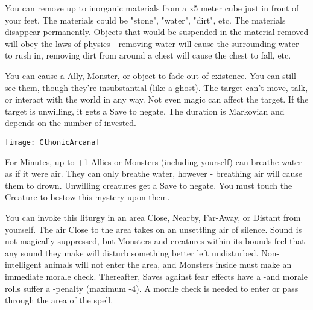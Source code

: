 {\MYSTERY [
  Name = Excavate,
  Link = arcana-mystery-excavate,
  Paradigm = Elements,
  Save = N,
  Duration = Instant,
  Target = Close
]

You can remove up to \DICE inorganic materials from a \DICE x5 meter cube just in front of your feet.  The materials could be "stone", "water", "dirt", etc. The materials disappear permanently. Objects that would be suspended in the material removed will obey the laws of physics - removing water will cause the surrounding water to rush in, removing dirt from around a chest will cause the chest to fall, etc.

\MYSTERY [
  Name = Fade,
  Link = arcana-mystery-fade,
  Paradigm = Mind,
  Save = Y (neg.),
  Duration = Markovian,
  Target = Nearby Target(s)
]

You can cause a Ally, Monster, or object to fade out of existence.  You can still see them, though they're insubstantial (like a ghost).  The target can't move, talk, or interact with the world in any way.  Not even magic can affect the target.  If the target is unwilling, it gets a Save to negate.  The duration is Markovian and depends on the number of \DICE invested.

  \begin{center}
  \texttt{[image: CthonicArcana]}
  \end{center}


\MYSTERY [
  Name = Mermaid's Breath,
  Link = arcana-mystery-mermaids-breath,
  Paradigm = Biomancy,
  Save = Y (neg.),
  Duration = \SUM Minutes,
  Target = Self or Close Target(s)
]

For \SUMDICE Minutes, up to \DICE+1 Allies or Monsters (including yourself) can breathe water as if it were air.  They can only breathe water, however - breathing air will cause them to drown. Unwilling creatures get a Save to negate.  You must touch the Creature to bestow this mystery upon them. 

\MYSTERY [
  Name = Sinister Stillness,
  Link = arcana-mystery-sinister-stillness,
  Paradigm = Mind,
  Save = N,
  Duration = Combat or \SUM Minutes,
  Target = Close\, Nearby\, Far-Away\, or Distant
]

You can invoke this liturgy in an area  Close, Nearby, Far-Away, or Distant from yourself.  The air Close to the area takes on an unsettling air of silence.  Sound is not magically suppressed, but Monsters and creatures within its bounds feel that any sound they make will disturb something better left undisturbed.  Non-intelligent animals will not enter the area, and Monsters inside must make an immediate morale check. Thereafter, Saves against fear effects have a -\DICE and morale rolls suffer a -\DICE penalty (maximum -4).  A morale check is needed to enter or pass through the area of the spell.

}
